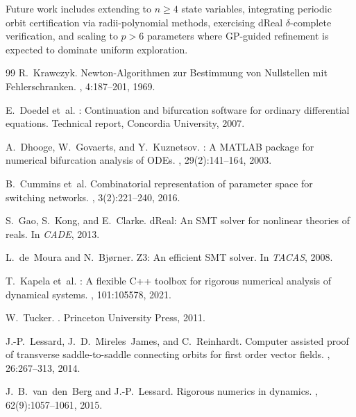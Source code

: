 \documentclass[11pt]{article}
\begin{document}
Future work includes extending to $n \geq 4$ state variables, integrating periodic orbit certification via radii-polynomial methods, exercising dReal $\delta$-complete verification, and scaling to $p > 6$ parameters where GP-guided refinement is expected to dominate uniform exploration.


\begin{thebibliography}{99}
R.~Krawczyk.
\newblock Newton-{A}lgorithmen zur {B}estimmung von {N}ullstellen mit {F}ehlerschranken.
, 4:187--201, 1969.

E.~Doedel et~al.
: Continuation and bifurcation software for ordinary differential equations.
\newblock Technical report, Concordia University, 2007.

A.~Dhooge, W.~Govaerts, and Y.~Kuznetsov.
: A {MATLAB} package for numerical bifurcation analysis of {ODE}s.
, 29(2):141--164, 2003.

B.~Cummins et~al.
\newblock Combinatorial representation of parameter space for switching networks.
, 3(2):221--240, 2016.

S.~Gao, S.~Kong, and E.~Clarke.
\newblock d{R}eal: An {SMT} solver for nonlinear theories of reals.
\newblock In {\em CADE}, 2013.

L.~de~Moura and N.~Bj{\o}rner.
\newblock Z3: An efficient {SMT} solver.
\newblock In {\em TACAS}, 2008.

T.~Kapela et~al.
: A flexible {C++} toolbox for rigorous numerical analysis of dynamical systems.
, 101:105578, 2021.

W.~Tucker.
.
\newblock Princeton University Press, 2011.

J.-P.~Lessard, J.~D.~Mireles~James, and C.~Reinhardt.
\newblock Computer assisted proof of transverse saddle-to-saddle connecting orbits for first order vector fields.
, 26:267--313, 2014.

J.~B.~van~den~Berg and J.-P.~Lessard.
\newblock Rigorous numerics in dynamics.
, 62(9):1057--1061, 2015.


\end{thebibliography}
\end{document}
